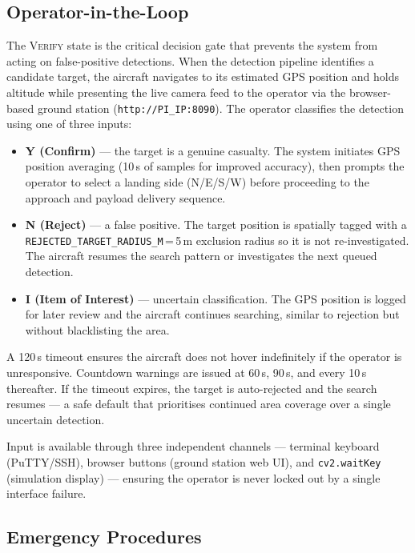 \subsection{Operator-in-the-Loop}\label{sec:operator-loop}

The \textsc{Verify} state is the critical decision gate that prevents the system from acting on false-positive detections. When the detection pipeline identifies a candidate target, the aircraft navigates to its estimated GPS position and holds altitude while presenting the live camera feed to the operator via the browser-based ground station (\texttt{http://PI\_IP:8090}). The operator classifies the detection using one of three inputs:

\begin{itemize}
    \item \textbf{Y (Confirm)} --- the target is a genuine casualty. The system initiates GPS position averaging (10\,s of samples for improved accuracy), then prompts the operator to select a landing side (N/E/S/W) before proceeding to the approach and payload delivery sequence.
    \item \textbf{N (Reject)} --- a false positive. The target position is spatially tagged with a \texttt{REJECTED\_TARGET\_RADIUS\_M}\,=\,5\,m exclusion radius so it is not re-investigated. The aircraft resumes the search pattern or investigates the next queued detection.
    \item \textbf{I (Item of Interest)} --- uncertain classification. The GPS position is logged for later review and the aircraft continues searching, similar to rejection but without blacklisting the area.
\end{itemize}

A 120\,s timeout ensures the aircraft does not hover indefinitely if the operator is unresponsive. Countdown warnings are issued at 60\,s, 90\,s, and every 10\,s thereafter. If the timeout expires, the target is auto-rejected and the search resumes --- a safe default that prioritises continued area coverage over a single uncertain detection.

Input is available through three independent channels --- terminal keyboard (PuTTY/SSH), browser buttons (ground station web UI), and \texttt{cv2.waitKey} (simulation display) --- ensuring the operator is never locked out by a single interface failure.

\subsection{Emergency Procedures}\label{sec:emergency}

